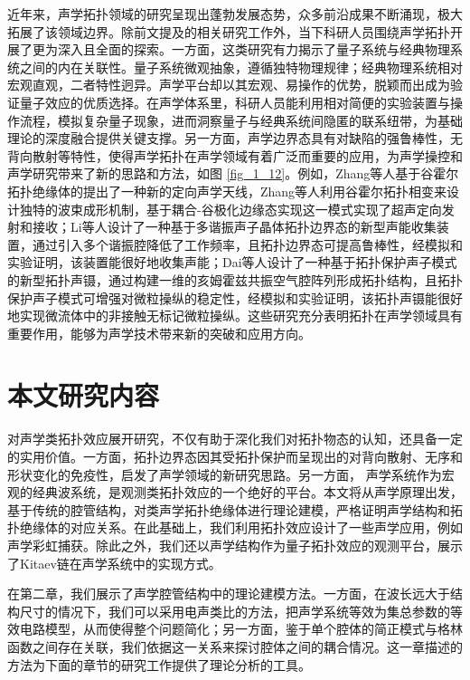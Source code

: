 近年来，声学拓扑领域的研究呈现出蓬勃发展态势，众多前沿成果不断涌现，极大拓展了该领域边界。除前文提及的相关研究工作外，当下科研人员围绕声学拓扑开展了更为深入且全面的探索\cite{j1,j2,j3,j4,j5,j6,j7,j8,j9,j10,j11,j12,j13,j14,j15,j16,j17,j18,j19,j20,j21,j22,j23,j24,j25,j26,j27,j28,j29,j30}。一方面，这类研究有力揭示了量子系统与经典物理系统之间的内在关联性。量子系统微观抽象，遵循独特物理规律；经典物理系统相对宏观直观，二者特性迥异。声学平台却以其宏观、易操作的优势，脱颖而出成为验证量子效应的优质选择。在声学体系里，科研人员能利用相对简便的实验装置与操作流程，模拟复杂量子现象，进而洞察量子与经典系统间隐匿的联系纽带，为基础理论的深度融合提供关键支撑。另一方面，声学边界态具有对缺陷的强鲁棒性，无背向散射等特性，使得声学拓扑在声学领域有着广泛而重要的应用，为声学操控和声学研究带来了新的思路和方法，如图 \ref{fig_1_12}。例如，Zhang等人基于谷霍尔拓扑绝缘体的提出了一种新的定向声学天线，Zhang等人利用谷霍尔拓扑相变来设计独特的波束成形机制，基于耦合-谷极化边缘态实现这一模式实现了超声定向发射和接收\cite{j2}；Li等人设计了一种基于多谐振声子晶体拓扑边界态的新型声能收集装置，通过引入多个谐振腔降低了工作频率，且拓扑边界态可提高鲁棒性，经模拟和实验证明，该装置能很好地收集声能\cite{j17}；Dai等人设计了一种基于拓扑保护声子模式的新型拓扑声镊，通过构建一维的亥姆霍兹共振空气腔阵列形成拓扑结构，且拓扑保护声子模式可增强对微粒操纵的稳定性，经模拟和实验证明，该拓扑声镊能很好地实现微流体中的非接触无标记微粒操纵\cite{j13}。这些研究充分表明拓扑在声学领域具有重要作用，能够为声学技术带来新的突破和应用方向。

\section{本文研究内容}

对声学类拓扑效应展开研究，不仅有助于深化我们对拓扑物态的认知，还具备一定的实用价值。一方面，拓扑边界态因其受拓扑保护而呈现出的对背向散射、无序和形状变化的免疫性，启发了声学领域的新研究思路。另一方面， 声学系统作为宏观的经典波系统，是观测类拓扑效应的一个绝好的平台。本文将从声学原理出发，基于传统的腔管结构，对类声学拓扑绝缘体进行理论建模，严格证明声学结构和拓扑绝缘体的对应关系。在此基础上，我们利用拓扑效应设计了一些声学应用，例如声学彩虹捕获。除此之外，我们还以声学结构作为量子拓扑效应的观测平台，展示了Kitaev链在声学系统中的实现方式。

在第二章，我们展示了声学腔管结构中的理论建模方法。一方面，在波长远大于结构尺寸的情况下，我们可以采用电声类比的方法，把声学系统等效为集总参数的等效电路模型，从而使得整个问题简化；另一方面，鉴于单个腔体的简正模式与格林函数之间存在关联，我们依据这一关系来探讨腔体之间的耦合情况。这一章描述的方法为下面的章节的研究工作提供了理论分析的工具。

